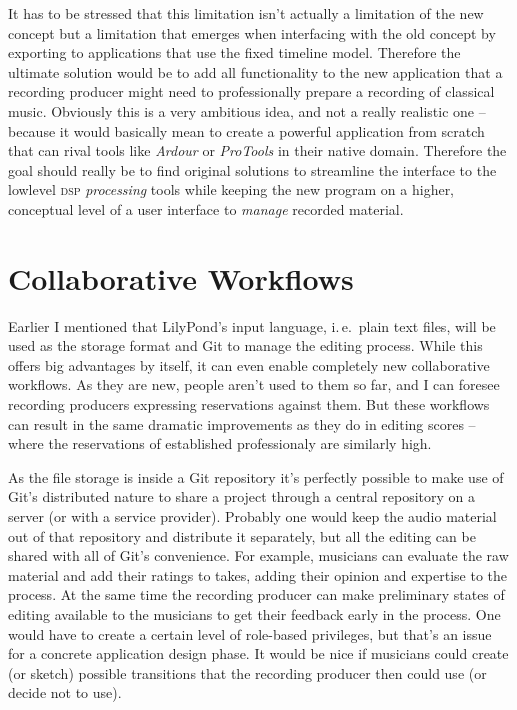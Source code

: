 \documentclass[11pt,a4paper]{article}
\begin{document}
It has to be stressed that this limitation isn't actually a limitation of the new
concept but a limitation that emerges when interfacing with the old concept by
exporting to applications that use the fixed timeline model. Therefore the
ultimate solution would be to add all functionality to the new application
that a recording producer might need to professionally prepare a recording of
classical music. Obviously this is a very ambitious idea, and not a really realistic
one -- because it would basically mean to create a powerful application from scratch
that can rival tools like \emph{Ardour} or \emph{ProTools} in their native domain.
Therefore the goal should really be to find original solutions to streamline the
interface to the lowlevel \textsc{dsp} \emph{processing} tools while keeping the new program on a
higher, conceptual level of a user interface to \emph{manage} recorded material.



\section{Collaborative Workflows}

Earlier I mentioned that LilyPond's input language, i.\,e.\ plain text files, 
will be used as the storage format and Git to manage the editing process.
While this offers big advantages by itself, it can even enable completely new
collaborative workflows.
As they are new, people aren't used to them so far, and I can foresee recording
producers expressing reservations against them.
But these workflows can result in the same dramatic improvements as they do in
editing scores -- where the reservations of established professionaly are
similarly high.

As the file storage is inside a Git repository it's perfectly possible to make
use of Git's distributed nature to share a project through a central repository
on a server (or with a service provider).
Probably one would keep the audio material out of that repository and distribute
it separately, but all the editing can be shared with all of Git's convenience.
For example, musicians can evaluate the raw material and add their ratings to
takes, adding their opinion and expertise to the process.
At the same time the recording producer can make preliminary states of editing
available to the musicians to get their feedback early in the process.
One would have to create a certain level of role-based privileges, but that's an
issue for a concrete application design phase.
It would be nice if musicians could create (or sketch) possible transitions that
the recording producer then could use (or decide not to use).
\end{document}
